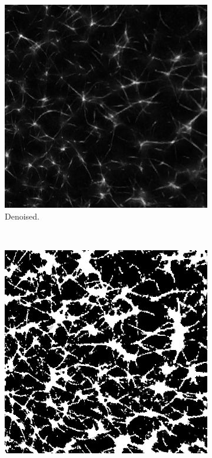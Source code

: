 \begin{figure}[H]
\begin{subfigure}{0.5\textwidth}
    \includegraphics[width=0.9\linewidth]{Figures/chapter-image/pipeline_screenshots/actin_denoised_wavelet_anisotropic.png}
    \caption{Denoised.}
    \label{fig:actin_denoised}
  \end{subfigure}\\[1ex]
  \begin{subfigure}{0.5\textwidth}
    \centering
    \includegraphics[width=0.9\linewidth]{Figures/chapter-image/pipeline_screenshots/actin_segmented_sparse.png}

\end{subfigure}
\end{figure}
